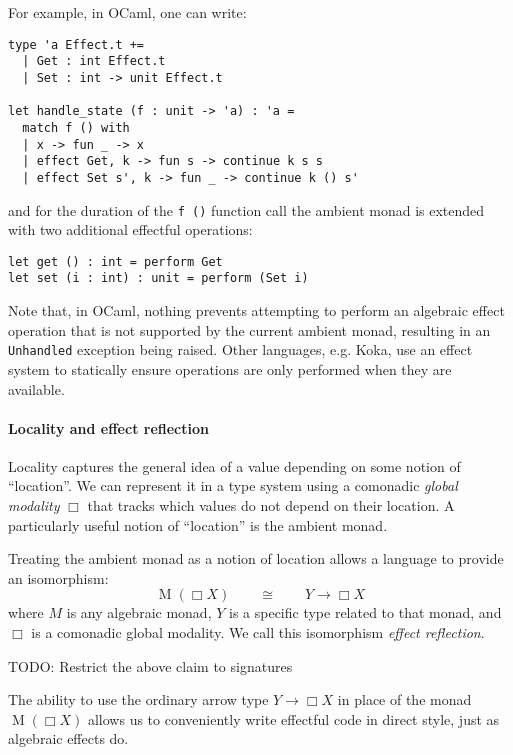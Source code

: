\documentclass[acmsmall, screen, nonacm]{acmart}
\theoremstyle{definition}
\newcommand{\glob}{\mathop{\Box}}
\newcommand{\todo}[1]{{\color{red}TODO: #1}}
\begin{document}
For example, in OCaml, one can write:
\begin{lstlisting}[style=oxcaml]
type 'a Effect.t +=
  | Get : int Effect.t
  | Set : int -> unit Effect.t

let handle_state (f : unit -> 'a) : 'a =
  match f () with
  | x -> fun _ -> x
  | effect Get, k -> fun s -> continue k s s
  | effect Set s', k -> fun _ -> continue k () s'
\end{lstlisting}
and for the duration of the \lstinline[style=oxcaml]{f ()} function call
the ambient monad is extended with two additional effectful operations:
\begin{lstlisting}[style=oxcaml]
let get () : int = perform Get
let set (i : int) : unit = perform (Set i)
\end{lstlisting}

Note that, in OCaml, nothing prevents attempting to perform an algebraic
effect operation that is not supported by the current ambient monad,
resulting in an \lstinline[style=oxcaml]{Unhandled} exception being
raised. Other languages, e.g. Koka\cite{??}, use an effect system to
statically ensure operations are only performed when they are available.

\paragraph{Locality and effect reflection}
Locality captures the general idea of a value depending on some notion
of ``location''. We can represent it in a type system using a comonadic
\emph{global modality} $\glob$ that tracks which values do not depend on
their location. A particularly useful notion of ``location'' is the
ambient monad.

Treating the ambient monad as a notion of location allows a language to
provide an isomorphism:
\begin{equation*}
  \mathop{M}(\glob X) \qquad \cong \qquad Y \mathbin{\rightarrow} \glob X
\end{equation*}
where $M$ is any algebraic monad, $Y$ is a specific type related to that
monad, and $\glob$ is a comonadic global modality. We call this
isomorphism \emph{effect reflection}.

\todo{Restrict the above claim to signatures}

The ability to use the ordinary arrow type
$Y \mathbin{\rightarrow} \glob X$ in place of the monad
$\mathop{M}(\glob X)$ allows us to conveniently write effectful
code in direct style, just as algebraic effects do.
\end{document}
